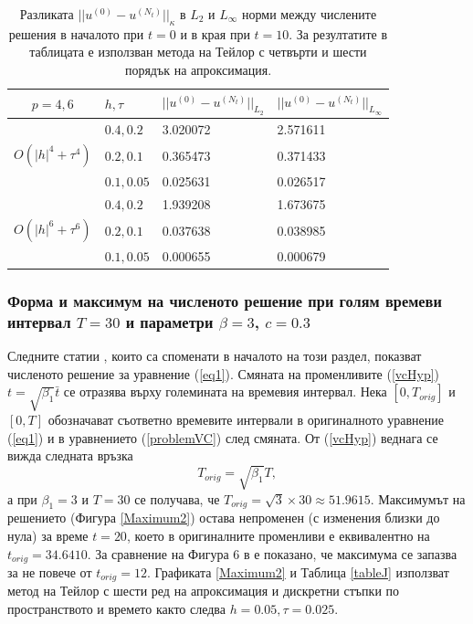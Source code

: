 \documentclass[a4paper]{article}
\newcommand{\rf}[1]{(\ref{#1})}
\theoremstyle{remark}
\begin{document}
\begin{table}[ht]
\centering
\small
		\begin{tabular}{||c|l|l|l||}
			\hline
			\hline
  $p=4,6$   &  $h, \tau$ &  $||u^{(0)} - u^{(N_t)}||_{L_2}$  & $||u^{(0)} - u^{(N_t)}||_{L_\infty}$   \\
   		      \hline 
			\hline
           				& $0.4, 0.2$   &  3.020072 & 2.571611     \\
			\hline 
  $O(|h|^4+\tau^4)$ & $0.2, 0.1$   & 0.365473 & 0.371433      \\
			\hline 
           				& $0.1, 0.05$ & 0.025631 & 0.026517      \\
	   \hline
          \hline
           				& $0.4, 0.2$   & 1.939208 & 1.673675      \\
			\hline
  $O(|h|^6+\tau^6)$ & $0.2, 0.1$   & 0.037638 & 0.038985      \\
    \hline
           				& $0.1, 0.05$  & 0.000655 & 0.000679       \\
	   \hline
		\hline 
		\end{tabular}
		\caption{Разликата $||u^{(0)} - u^{(N_t)}||_\kappa$ в $L_2$ и $L_\infty$ норми между числените решения в началото при $t=0$ и в края при $t=10$. За резултатите в таблицата е използван метода на Тейлор с четвърти и шести порядък на апроксимация. }
\label{tableK}
\end{table}
\FloatBarrier

\subsubsection{Форма и максимум на численото решение при голям времеви интервал $T=30$ и параметри $\beta = 3$, $c=0.3$}
Следните статии \cite{ref21, dani, milenaDani, ref22}, които са споменати в началото на този раздел, показват численото решение за уравнение \rf{eq1}. Смяната на променливите \rf{vcHyp} $t = \sqrt{\beta_1} \bar{t}$ се отразява върху големината на времевия интервал. Нека $[0, T_{orig}]$ и $[0, T]$ обозначават съответно времевите интервали в оригиналното уравнение \rf{eq1} и в уравнението \rf{problemVC} след смяната. От \rf{vcHyp} веднага се вижда следната връзка
$$
T_{orig} = \sqrt{\beta_1} T,
$$
а при $\beta_1 = 3$ и $T=30$ се получава, че $T_{orig} = \sqrt{3} \times 30 \approx 51.9615$. Максимумът на решението (Фигура \ref{Maximum2}) остава непроменен (с изменения близки до нула) за време $t=20$, което в оригиналните променливи е еквивалентно на $t_{orig}=34.6410$. За сравнение на Фигура 6 в \cite{ref21} е показано, че максимума се запазва за не повече от $t_{orig}=12$. Графиката \ref{Maximum2} и Таблица \ref{tableJ} използват метод на Тейлор с шести ред на апроксимация и дискретни стъпки по пространството и времето както следва $h=0.05, \tau = 0.025$.
\end{document}
